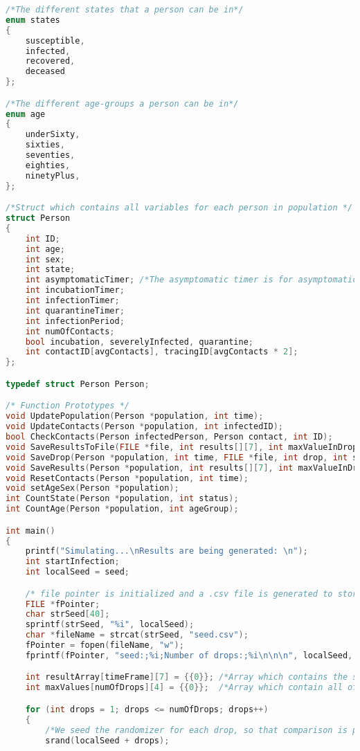 \begin{lstlisting}[language=c, caption={Our simulations written in c}, captionpos=b, label={snippet:LABELNAVN}]
/*The different states that a person can be in*/
enum states
{
    susceptible,
    infected,
    recovered,
    deceased
};

/*The different age-groups a person can be in*/
enum age
{
    underSixty,
    sixties,
    seventies,
    eighties,
    ninetyPlus,
};

/*Struct which contains all variables for each person in population */
struct Person
{
    int ID;
    int age;
    int sex;
    int state;
    int asymptomaticTimer; /*The asymptomatic timer is for asymptomatic patients as well as pre-symptomatic patients*/
    int incubationTimer;
    int infectionTimer;
    int quarantineTimer;
    int infectionPeriod;
    int numOfContacts;
    bool incubation, severelyInfected, quarantine;
    int contactID[avgContacts], tracingID[avgContacts * 2];
};

typedef struct Person Person;

/* Function Prototypes */
void UpdatePopulation(Person *population, int time);
void UpdateContacts(Person *population, int infectedID);
bool CheckContacts(Person infectedPerson, Person contact, int ID);
void SaveResultsToFile(FILE *file, int results[][7], int maxValueInDrop[][4]);
void SaveDrop(Person *population, int time, FILE *file, int drop, int selectedDrop);
void SaveResults(Person *population, int results[][7], int maxValueInDrop[][4], int drop, int time);
void ResetContacts(Person *population, int time);
void setAgeSex(Person *population);
int CountState(Person *population, int status);
int CountAge(Person *population, int ageGroup);

int main()
{
    printf("Simulating...\nResults are being generated: \n");
    int startInfection;
    int localSeed = seed;

    /* file pointer is initialized and a .csv file is generated to store the data from the simulation*/
    FILE *fPointer;
    char strSeed[40];
    sprintf(strSeed, "%i", localSeed);
    char *fileName = strcat(strSeed, "seed.csv");
    fPointer = fopen(fileName, "w");
    fprintf(fPointer, "seed:;%i;Number of drops:;%i\n\n\n", localSeed, numOfDrops);

    int resultArray[timeFrame][7] = {{0}}; /*Array which contains the sum of the results for all of the drops*/
    int maxValues[numOfDrops][4] = {{0}};  /*Array which contain all of the max values we are interested in extracting from each drop*/

    for (int drops = 1; drops <= numOfDrops; drops++)
    {
        /*We seed the randomizer for each drop, so that comparison is posibble, since if its not done, the next drops are affected by the previous drops rands*/
        srand(localSeed + drops);


\end{lstlisting}
